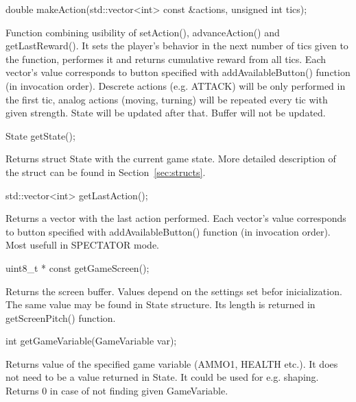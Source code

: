 \vspace{20pt}
\begin{clinee}
	double makeAction(std::vector<int> const &actions, unsigned int tics);
\end{clinee}

Function combining usibility of setAction(), advanceAction() and getLastReward(). It sets the player's behavior in the next number of tics given to the function, performes it and returns cumulative reward from all tics. Each vector's value corresponds to button specified with addAvailableButton() function (in invocation order). Descrete actions (e.g. ATTACK) will be only performed in the first tic, analog actions (moving, turning) will be repeated every tic with given strength.
State will be updated after that. Buffer will not be updated.


\vspace{20pt}
\begin{clinee}
	State getState();
\end{clinee}

Returns struct State with the current game state. More detailed description of the struct can be found in Section~\ref{sec:structs}.


\vspace{20pt}
\begin{clinee}
	std::vector<int> getLastAction();
\end{clinee}

Returns a vector with the last action performed. Each vector's value corresponds to button specified with addAvailableButton() function (in invocation order). Most usefull in SPECTATOR mode.


\vspace{20pt}
\begin{clinee}
	uint8_t * const getGameScreen();
\end{clinee}

Returns the screen buffer. Values depend on the settings set befor inicialization. The same value may be found in State structure. Its length is returned in getScreenPitch() function.


\vspace{20pt}
\begin{clinee}
	int getGameVariable(GameVariable var);
\end{clinee}

Returns value of the specified game variable (AMMO1, HEALTH etc.). It does not need to be a value returned in State.
It could be used for e.g. shaping. Returns 0 in case of not finding given GameVariable.


